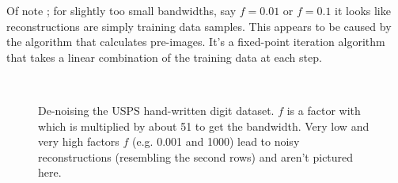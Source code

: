 \par Of note ; for slightly too small bandwidths, say $f=0.01$ or $f=0.1$ it looks like reconstructions are simply training data samples. This appears to be caused by the algorithm that calculates pre-images. It's a fixed-point iteration algorithm that takes a linear combination of the training data at each step.

\begin{figure}[h]
\centering
%
\hfil
{}\hfil
{}\hfil
{}\\
%
%
\caption{De-noising the USPS hand-written digit dataset. $f$ is a factor with which is multiplied by about 51 to get the bandwidth. Very low and very high factors $f$ (e.g. 0.001 and 1000) lead to noisy reconstructions (resembling the second rows) and aren't pictured here.}
\label{uspsband}
\end{figure}

